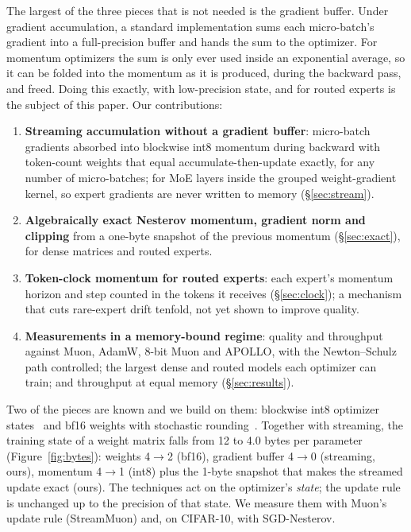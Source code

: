 \documentclass[10pt]{article}
\begin{document}
The largest of the three pieces that is not needed is the gradient buffer. Under gradient accumulation, a standard
implementation sums each micro-batch's gradient into a full-precision buffer and hands the sum to the optimizer. For
momentum optimizers the sum is only ever used inside an exponential average, so it can be folded into the momentum as
it is produced, during the backward pass, and freed. Doing this exactly, with low-precision state, and for routed
experts is the subject of this paper. Our contributions:
\begin{enumerate}
  \item \textbf{Streaming accumulation without a gradient buffer}: micro-batch gradients absorbed into blockwise int8
  momentum during backward with token-count weights that equal accumulate-then-update exactly, for any number of
  micro-batches; for MoE layers inside the grouped weight-gradient kernel, so expert gradients are never written to
  memory (\S\ref{sec:stream}).
  \item \textbf{Algebraically exact Nesterov momentum, gradient norm and clipping} from a one-byte snapshot of the
  previous momentum (\S\ref{sec:exact}), for dense matrices and routed experts.
  \item \textbf{Token-clock momentum for routed experts}: each expert's momentum horizon and step counted in the tokens
  it receives (\S\ref{sec:clock}); a mechanism that cuts rare-expert drift tenfold, not yet shown to improve quality.
  \item \textbf{Measurements in a memory-bound regime}: quality and throughput against Muon, AdamW, 8-bit Muon and
  APOLLO, with the Newton--Schulz path controlled; the largest dense and routed models each optimizer can train; and
  throughput at equal memory (\S\ref{sec:results}).
\end{enumerate}
Two of the pieces are known and we build on them: blockwise int8 optimizer states~\citep{dettmers2022eightbit,gupta2025muon8}
and bf16 weights with stochastic rounding~\citep{zamirai2020bf16,ozkara2025sr}. Together with streaming, the training
state of a weight matrix falls from 12 to 4.0 bytes per parameter (Figure~\ref{fig:bytes}): weights 4$\to$2 (bf16),
gradient buffer 4$\to$0 (streaming, ours), momentum 4$\to$1 (int8) plus the 1-byte snapshot that makes the streamed
update exact (ours). The techniques act on the optimizer's \emph{state}; the update rule is unchanged up to the
precision of that state. We measure them with Muon's update rule (StreamMuon) and, on CIFAR-10, with SGD-Nesterov.
\end{document}
